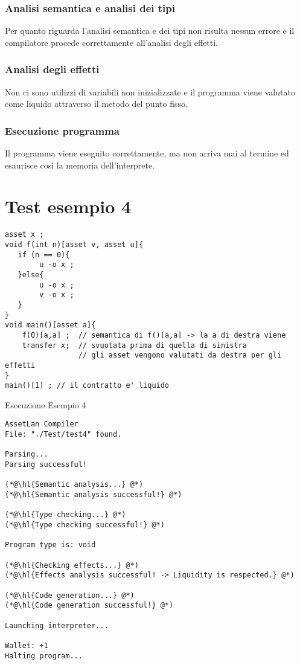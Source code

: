 \documentclass[12pt,twoside,openright,a4paper]{report}
\begin{document}
\subsubsection{Analisi semantica e analisi dei tipi}
Per quanto riguarda l'analisi semantica e dei tipi non risulta nessun errore e il compilatore procede correttamente all'analisi degli effetti.

\subsubsection{Analisi degli effetti}
Non ci sono utilizzi di variabili non inizializzate e il programma viene valutato come liquido attraverso il metodo del punto fisso.

\subsubsection{Esecuzione programma}
Il programma viene eseguito correttamente, ma non arriva mai al termine ed esaurisce così la memoria dell'interprete.



\section{Test esempio 4}
\begin{lstlisting}
asset x ;
void f(int n)[asset v, asset u]{
   if (n == 0){
        u -o x ;
   }else{
        u -o x ;
        v -o x ;
   }
}
void main()[asset a]{
    f(0)[a,a] ;	 // semantica di f()[a,a] -> la a di destra viene 
    transfer x;  // svuotata prima di quella di sinistra
	             // gli asset vengono valutati da destra per gli effetti
}
main()[1] ;	// il contratto e' liquido
\end{lstlisting}
Esecuzione Esempio 4
\begin{lstlisting}
AssetLan Compiler
File: "./Test/test4" found.

Parsing...
Parsing successful!

(*@\hl{Semantic analysis...} @*)
(*@\hl{Semantic analysis successful!} @*)

(*@\hl{Type checking...} @*)
(*@\hl{Type checking successful!} @*)

Program type is: void

(*@\hl{Checking effects...} @*)
(*@\hl{Effects analysis successful! -> Liquidity is respected.} @*)

(*@\hl{Code generation...} @*)
(*@\hl{Code generation successful!} @*)

Launching interpreter...

Wallet: +1
Halting program...

\end{lstlisting}
\end{document}
